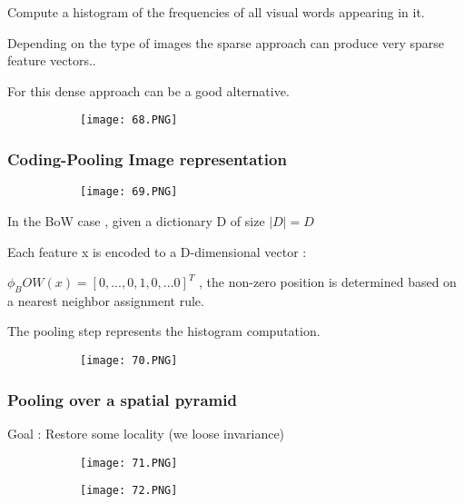 \documentclass{article}
\begin{document}
Compute a histogram of the frequencies of all visual words appearing in it.

Depending on the type of images the sparse approach can produce very sparse feature vectors..

For this dense approach can be a good alternative.

\begin{figure}[ht!]
  \centering
  \begin{subfigure}[b]{0.8\linewidth}
    \texttt{[image: 68.PNG]}
  \end{subfigure}
\end{figure}

\subsubsection{Coding-Pooling Image representation}


\begin{figure}[ht!]
  \centering
  \begin{subfigure}[b]{0.8\linewidth}
    \texttt{[image: 69.PNG]}
  \end{subfigure}
\end{figure}

In the BoW case , given a dictionary D of size $|D| = D$

Each feature x is encoded to a D-dimensional vector : 

$\phi_BOW (x) = [0,...,0,1,0,...0]^T$ , the non-zero position is determined based on a nearest neighbor assignment rule.

The pooling step represents the histogram computation.

\begin{figure}[ht!]
  \centering
  \begin{subfigure}[b]{0.8\linewidth}
    \texttt{[image: 70.PNG]}
  \end{subfigure}
\end{figure}

\vspace{40mm}

\subsubsection{Pooling over a spatial pyramid}

Goal : Restore some locality (we loose invariance)

\begin{figure}[ht!]
  \centering
  \begin{subfigure}[b]{0.5\linewidth}
    \texttt{[image: 71.PNG]}
  \end{subfigure}
     \begin{subfigure}[b]{0.49\textwidth}
         \centering
         \texttt{[image: 72.PNG]}
     \end{subfigure}
\end{figure}
\end{document}
